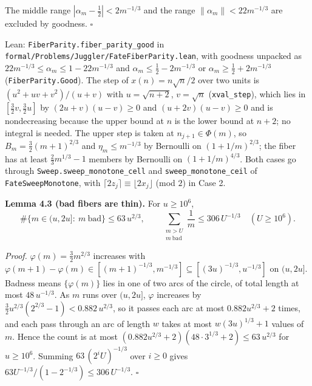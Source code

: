 \documentclass[11pt,a4paper]{article}
\begin{document}
The middle range \(|\alpha_m-\tfrac12|<2m^{-1/3}\) and the range
\(\|\alpha_m\|<22m^{-1/3}\) are excluded by goodness. \(\square\)

Lean: \texttt{\nolinkurl{FiberParity.fiber_parity_good}} in
\texttt{\nolinkurl{formal/Problems/Juggler/FateFiberParity.lean}}, with
goodness unpacked as \(22m^{-1/3}\le\alpha_m\le 1-22m^{-1/3}\) and
\(\alpha_m\le\tfrac12-2m^{-1/3}\) or \(\alpha_m\ge\tfrac12+2m^{-1/3}\)
(\texttt{\nolinkurl{FiberParity.Good}}). The step of \(x(n)=n\sqrt n/2\)
over two units is \((u^2+uv+v^2)/(u+v)\) with \(u=\sqrt{n+2}\),
\(v=\sqrt n\) (\texttt{\nolinkurl{xval_step}}), which lies in
\([\tfrac32v,\tfrac32u]\) by \((2u+v)(u-v)\ge 0\) and
\((u+2v)(u-v)\ge 0\) and is nondecreasing because the upper bound at
\(n\) is the lower bound at \(n+2\); no integral is needed. The upper
step is taken at \(n_{j+1}\in\Phi(m)\), so \(B_m=\tfrac32(m+1)^{2/3}\)
and \(\eta_m\le m^{-1/3}\) by Bernoulli on \((1+1/m)^{2/3}\); the fiber
has at least \(\tfrac23m^{1/3}-1\) members by Bernoulli on
\((1+1/m)^{4/3}\). Both cases go through
\texttt{\nolinkurl{Sweep.sweep_monotone_cell}} and
\texttt{\nolinkurl{sweep_monotone_ceil}} of
\texttt{\nolinkurl{FateSweepMonotone}}, with
\(\lceil 2z_j\rceil\equiv\lfloor 2x_j\rfloor\) (mod \(2\)) in Case 2.

\textbf{Lemma 4.3 (bad fibers are thin).} For \(u\ge 10^6\), \[
\#\{m\in(u,2u]:\ m\ \text{bad}\}\le 63\,u^{2/3},
\qquad
\sum_{\substack{m>U\\ m\ \text{bad}}}\frac1m\le 306\,U^{-1/3}\quad(U\ge 10^6).
\]

\emph{Proof.} \(\varphi(m)=\tfrac32m^{2/3}\) increases with
\(\varphi(m+1)-\varphi(m)\in[(m+1)^{-1/3},m^{-1/3}]\subseteq[(3u)^{-1/3},u^{-1/3}]\)
on \((u,2u]\). Badness means \(\{\varphi(m)\}\) lies in one of two arcs
of the circle, of total length at most \(48\,u^{-1/3}\). As \(m\) runs
over \((u,2u]\), \(\varphi\) increases by
\(\tfrac32u^{2/3}(2^{2/3}-1)<0.882\,u^{2/3}\), so it passes each arc at
most \(0.882u^{2/3}+2\) times, and each pass through an arc of length
\(w\) takes at most \(w(3u)^{1/3}+1\) values of \(m\). Hence the count
is at most \((0.882u^{2/3}+2)(48\cdot 3^{1/3}+2)\le 63\,u^{2/3}\) for
\(u\ge 10^6\). Summing \(63\,(2^iU)^{-1/3}\) over \(i\ge 0\) gives
\(63U^{-1/3}/(1-2^{-1/3})\le 306\,U^{-1/3}\). \(\square\)
\end{document}
